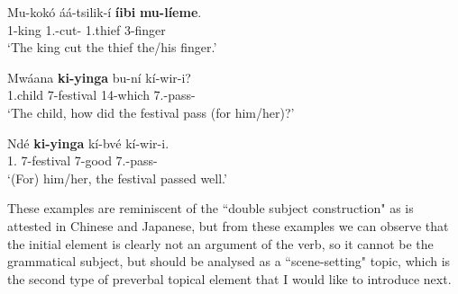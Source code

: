 \documentclass[output=paper,colorlinks,citecolor=brown,
]{langscibook}
\begin{document}
\begin{exe} 
\ex
\label{99}
\gll
Mu-kokó áá-tsilik-í \textbf{{\textltailm}íibi} \textbf{mu-líeme}.\\
1-king 1\Sm{}.\Pst{}-cut-\Pst{} 1.thief 3-finger\\
\trans ‘The king cut the thief the/his finger.’

\end{exe}
\begin{exe} 
    \ex \label{100}
    \begin{xlist}
\ex
\label{100a}
\gll
Mwáana \textbf{ki-yinga} bu-ní kí-wir-i?\\
1.child 7-festival 14-which 7\Sm{}.\Pst{}-pass-\Pst{}\\
\trans ‘The child, how did the festival pass (for him/her)?’

\ex
\label{100b}
\gll
Ndé \textbf{ki-yinga} kí-bvé kí-wir-i.\\
1.\Pro{} 7-festival 7-good 7\Sm{}.\Pst{}-pass-\Pst{}\\
\trans ‘(For) him/her, the festival passed well.’

\end{xlist}
\end{exe}
These examples are reminiscent of the ``double subject construction" as is attested in Chinese and Japanese, but from these examples we can observe that the initial element is clearly not an argument of the verb, so it cannot be the grammatical subject, but should be analysed as a ``scene-setting" topic, which is the second type of preverbal topical element that I would like to introduce next.
\end{document}
